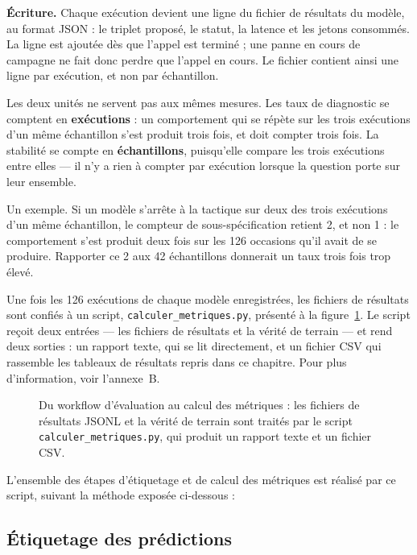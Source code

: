 \textbf{Écriture.} Chaque exécution devient une ligne du fichier de résultats du modèle, au format JSON : le triplet proposé, le statut, la latence et les jetons consommés. La ligne est ajoutée dès que l'appel est terminé ; une panne en cours de campagne ne fait donc perdre que l'appel en cours. Le fichier contient ainsi une ligne par exécution, et non par échantillon.

Les deux unités ne servent pas aux mêmes mesures. Les taux de diagnostic se comptent en \textbf{exécutions} : un comportement qui se répète sur les trois exécutions d'un même échantillon s'est produit trois fois, et doit compter trois fois. La stabilité se compte en \textbf{échantillons}, puisqu'elle compare les trois exécutions entre elles --- il n'y a rien à compter par exécution lorsque la question porte sur leur ensemble.

Un exemple. Si un modèle s'arrête à la tactique sur deux des trois exécutions d'un même échantillon, le compteur de sous-spécification retient 2, et non 1 : le comportement s'est produit deux fois sur les 126 occasions qu'il avait de se produire. Rapporter ce 2 aux 42 échantillons donnerait un taux trois fois trop élevé.

Une fois les 126 exécutions de chaque modèle enregistrées, les fichiers de résultats sont confiés à un script, \texttt{calculer\_metriques.py}, présenté à la figure~\ref{fig:workflow-metriques}. Le script reçoit deux entrées --- les fichiers de résultats et la vérité de terrain --- et rend deux sorties : un rapport texte, qui se lit directement, et un fichier CSV qui rassemble les tableaux de résultats repris dans ce chapitre. Pour plus d'information, voir l'annexe~B.

\begin{figure}[htbp]
\centering
{}
\caption{Du workflow d'évaluation au calcul des métriques : les fichiers de résultats JSONL et la vérité de terrain sont traités par le script \texttt{calculer\_metriques.py}, qui produit un rapport texte et un fichier CSV.}\label{fig:workflow-metriques}
\end{figure}

L'ensemble des étapes d'étiquetage et de calcul des métriques est réalisé par ce script, suivant la méthode exposée ci-dessous :

\FloatBarrier
\subsection{Étiquetage des prédictions}\label{sec:meth-etiquetage}

